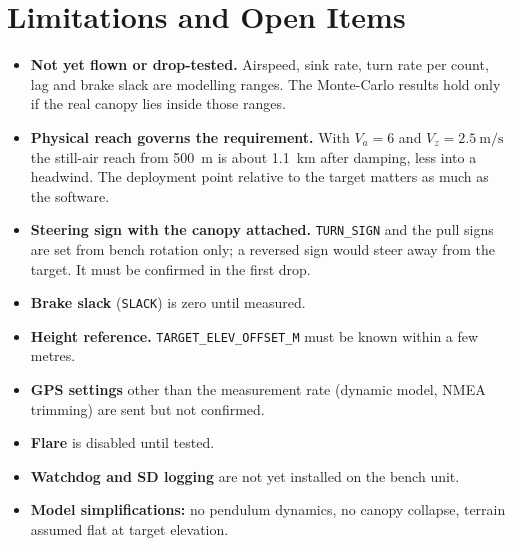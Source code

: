 \documentclass[11pt,a4paper]{article}
\newcommand{\code}[1]{\texttt{#1}}
\begin{document}
\section{Limitations and Open Items}
\label{sec:limits}

\begin{itemize}
  \item \textbf{Not yet flown or drop-tested.} Airspeed, sink rate, turn rate
        per count, lag and brake slack are modelling ranges. The Monte-Carlo
        results hold only if the real canopy lies inside those ranges.
  \item \textbf{Physical reach governs the requirement.} With
        $V_a = 6$ and $V_z = \SI{2.5}{\meter\per\second}$ the still-air reach
        from \SI{500}{\meter} is about \SI{1.1}{\kilo\meter} after damping, less
        into a headwind. The deployment point relative to the target matters
        as much as the software.
  \item \textbf{Steering sign with the canopy attached.} \code{TURN\_SIGN} and
        the pull signs are set from bench rotation only; a reversed sign
        would steer away from the target. It must be confirmed in the first
        drop.
  \item \textbf{Brake slack} (\code{SLACK}) is zero until measured.
  \item \textbf{Height reference.} \code{TARGET\_ELEV\_OFFSET\_M} must be
        known within a few metres.
  \item \textbf{GPS settings} other than the measurement rate (dynamic model,
        NMEA trimming) are sent but not confirmed.
  \item \textbf{Flare} is disabled until tested.
  \item \textbf{Watchdog and SD logging} are not yet installed on the bench
        unit.
  \item \textbf{Model simplifications:} no pendulum dynamics, no canopy
        collapse, terrain assumed flat at target elevation.
\end{itemize}

\end{document}
